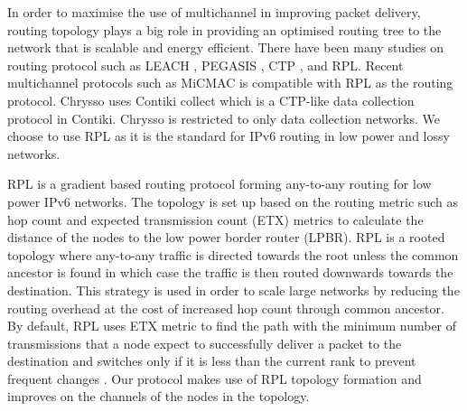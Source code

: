 In order to maximise the use of multichannel in improving packet delivery, routing topology plays a big role in providing an optimised routing tree to the network that is scalable and energy efficient. There have been many studies on routing protocol such as LEACH \cite{leach}, PEGASIS \cite{pegasis}, CTP \cite{ctp}, and RPL. Recent multichannel protocols such as MiCMAC is compatible with RPL as the routing protocol. Chrysso uses Contiki collect which is a CTP-like data collection protocol in Contiki. Chrysso is restricted to only data collection networks. We choose to use RPL as it is the standard for IPv6 routing in low power and lossy networks.

RPL \cite{winter2012rpl} is a gradient based routing protocol forming any-to-any routing for low power IPv6 networks. The topology is set up based on the routing metric \cite{routingmetrics} such as hop count and expected transmission count (ETX) metrics to calculate the distance of the nodes to the low power border router (LPBR). RPL is a rooted topology where any-to-any traffic is directed towards the root unless the common ancestor is found in which case the traffic is then routed downwards towards the destination. This strategy is used in order to scale large networks by reducing the routing overhead at the cost of increased hop count through common ancestor. By default, RPL uses ETX metric to find the path with the minimum number of transmissions that a node expect to successfully deliver a packet to the destination and switches only if it is less than the current rank to prevent frequent changes \cite{mrhof}. Our protocol makes use of RPL topology formation and improves on the channels of the nodes in the topology.